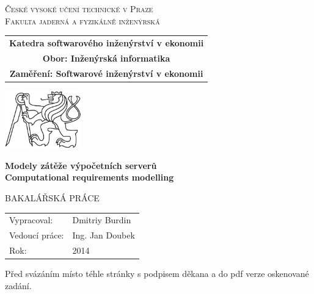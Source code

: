 \documentclass[a4paper,12pt,twoside]{scrreprt}
\newcommand{\cvut}{České vysoké učení technické v Praze}
\newcommand{\fjfi}{Fakulta jaderná a fyzikálně inženýrská}
\newcommand{\kse}{Katedra softwarového inženýrství v ekonomii}
\newcommand{\obor}{Inženýrská informatika}
\newcommand{\zamereni}{Softwarové inženýrství v ekonomii}
\newcommand{\nazevcz}{Modely zátěže výpočetních serverů}        %
\newcommand{\nazeven}{Computational requirements modelling}     %
\newcommand{\autor}{Dmitriy Burdin}           %
\newcommand{\rok}{2014}          %
\newcommand{\vedouci}{Ing. Jan Doubek}         %
\newcommand{\druh}{BAKALÁŘSKÁ PRÁCE}
\begin{document}
\thispagestyle{empty}

\begin{center}
    {\Large \textsc{\cvut}\\[1.5ex] \textsc{\fjfi}}\\
    \vspace{10mm}

    \begin{tabular}{c}
	    {\bf \kse}\\   
      {\bf Obor: \obor}\\
      {\bf Zaměření: \zamereni}\\
    \end{tabular}

   \vspace{10mm} \includegraphics[height=25mm]{lev.pdf} \vspace{15mm}

   {\huge \bf \nazevcz}\\
   \vspace{5mm}   
   {\huge \bf \nazeven}
   
   \vspace{15mm}
   {\Large \druh}

   \vfill
   {\large
    \begin{tabular}{ll}
    Vypracoval: & \autor\\
    Vedoucí práce: & \vedouci\\
    Rok: & \rok
    \end{tabular}
   }
\end{center}

\newpage  %
\thispagestyle{empty} %

Před svázáním místo téhle stránky  s podpisem
děkana a do pdf verze oskenované zadání.
\end{document}
